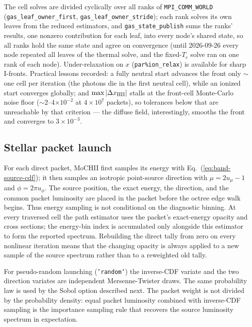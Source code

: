 \documentclass[english,a4paper]{my_memo}
\newcommand{\code}[1]{\texttt{#1}}
\begin{document}
The cell solves are divided cyclically over all ranks of
\code{MPI\_COMM\_WORLD} (\code{gas\_leaf\_owner\_\allowbreak first},
\code{gas\_leaf\_owner\_\allowbreak stride}); each rank solves its own leaves from the
reduced estimators, and \code{gas\_state\_publish} sums the ranks' results,
one nonzero contribution for each leaf, into every node's shared state, so
all ranks hold the same state and agree on convergence (until 2026-09-26
every node repeated all leaves of the thermal solve, and the fixed-$T_e$
solve ran on one rank of each node).  Under-relaxation on $x$
(\code{par\%ion\_relax}) is available for sharp I-fronts.  Practical
lessons recorded: a fully neutral start advances the front only
$\sim$one cell per iteration (the photons die in the first neutral
cell), while an ionized start converges globally; and
$\max|\Delta x_{\rm HII}|$ stalls at the front-cell Monte-Carlo noise
floor ($\sim$2--4${\times}10^{-2}$ at $4{\times}10^7$ packets), so
tolerances below that are unreachable by that criterion --- the
diffuse field, interestingly, smooths the front and converges to
$3{\times}10^{-3}$.

\subsection{Stellar packet launch}
\label{sec:stellar-launch}
For each direct packet, MoCHII first samples its energy with
Eq.~(\ref{eq:band-source-cdf}); it then samples an isotropic point-source
direction with $\mu=2u_\mu-1$ and $\phi=2\pi u_\phi$.  The source position,
the exact energy, the direction, and the common packet luminosity are placed
in the packet before the octree edge walk begins.  Thus energy sampling is
not conditional on the diagnostic binning.  At every traversed cell the
path estimator uses the packet's exact-energy opacity and cross sections;
the energy-bin index is accumulated only alongside this estimator to form
the reported spectrum.  Rebuilding the direct tally from zero on every
nonlinear iteration means that the changing opacity is always applied to a
new sample of the source spectrum rather than to a reweighted old tally.

For pseudo-random launching (\code{'random'}) the inverse-CDF variate and the two
direction variates are independent Mersenne-Twister draws.  The same
probability law is used by the Sobol option described next.  The packet
weight is not divided by the probability density: equal packet luminosity
combined with inverse-CDF sampling is the importance sampling rule that
recovers the source luminosity spectrum in expectation.
\end{document}
